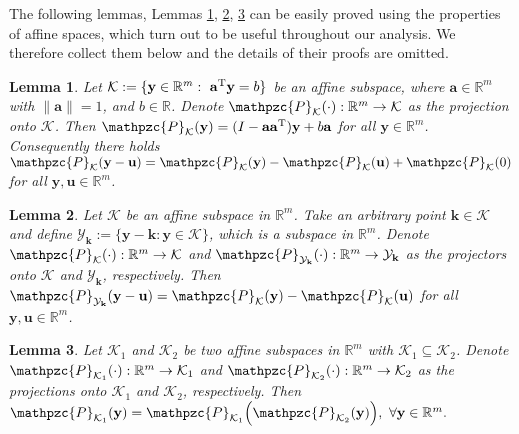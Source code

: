 \documentclass[a4paper, 11pt]{article}
\def\T{^{\rm\tiny T}}
\newtheorem{lemma}{Lemma}
\begin{document}
The following lemmas, Lemmas \ref{lem:affineprojection}, \ref{lem:subspace-affine-projection}, \ref{lem:doubleprojection} can be easily proved using the properties of affine spaces, which turn out to be useful throughout our analysis. We therefore collect them below and the details of their proofs are omitted.
\begin{lemma}\label{lem:affineprojection}
Let $\mathcal{K}:=\{\mathbf{y}\in\mathbb{R}^m:\ \mathbf{a}\T \mathbf{y}=b\}$ be an affine subspace, where $\mathbf{a} \in \mathbb{R}^m$ with $\|\mathbf{a}\|=1$, and $b\in\mathbb{R}$. Denote $\mathpzc{P}_{\mathcal{K}}(\cdot): \mathbb{R}^m \rightarrow \mathcal{K}$ as the projection onto $\mathcal{K}$. Then $\mathpzc{P}_{\mathcal{K}}(\mathbf{y})=(I-\mathbf{a}\mathbf{a}\T)\mathbf{y}+b\mathbf{a}$ for all $\mathbf{y}\in\mathbb{R}^m$. Consequently there holds $\mathpzc{P}_{\mathcal{K}} (\mathbf{y} -\mathbf{u})=\mathpzc{P}_{\mathcal{K}}(\mathbf{y})-\mathpzc{P}_{\mathcal{K}}(\mathbf{u})+\mathpzc{P}_{\mathcal{K}}(0)$ for all $\mathbf{y},\mathbf{u}\in\mathbb{R}^m$.
\end{lemma}
\begin{lemma}\label{lem:subspace-affine-projection}
Let $\mathcal{K}$ be an affine subspace in $\mathbb{R}^m$. Take an arbitrary point $\mathbf{k}\in\mathcal{K}$ and define $\mathcal{Y}_{\mathbf{k}}:=\{\mathbf{y}-\mathbf{k}:\mathbf{y}\in\mathcal{K}\}$, which is a subspace in $\mathbb{R}^m$.  Denote $\mathpzc{P}_{\mathcal{K}}(\cdot): \mathbb{R}^m \rightarrow \mathcal{K}$  and $\mathpzc{P}_{\mathcal{Y}_{\mathbf{k}}}(\cdot): \mathbb{R}^m \rightarrow \mathcal{Y}_{\mathbf{k}}$ as the projectors onto $\mathcal{K}$ and $\mathcal{Y}_{\mathbf{k}}$, respectively. Then $\mathpzc{P}_{\mathcal{Y}_{\mathbf{k}}} (\mathbf{y} -\mathbf{u})=\mathpzc{P}_{\mathcal{K}}(\mathbf{y})-\mathpzc{P}_{\mathcal{K}}(\mathbf{u})$ for all $\mathbf{y},\mathbf{u}\in\mathbb{R}^m$.
\end{lemma}
\begin{lemma}\label{lem:doubleprojection}
Let $\mathcal{K}_1$ and $\mathcal{K}_2$ be two affine subspaces in $\mathbb{R}^m$ with $\mathcal{K}_1 \subseteq \mathcal{K}_2$. Denote $\mathpzc{P}_{\mathcal{K}_1}(\cdot): \mathbb{R}^m \rightarrow \mathcal{K}_1$ and  $\mathpzc{P}_{\mathcal{K}_2}(\cdot): \mathbb{R}^m \rightarrow \mathcal{K}_2$ as the projections onto $\mathcal{K}_1$ and $\mathcal{K}_2$, respectively. Then $
\mathpzc{P}_{\mathcal{K}_1}(\mathbf{y}) =\mathpzc{P}_{\mathcal{K}_1}\Big(\mathpzc{P}_{\mathcal{K}_2}(\mathbf{y})\Big), \ \forall \mathbf{y}\in\mathbb{R}^m.
$
\end{lemma}
\end{document}
